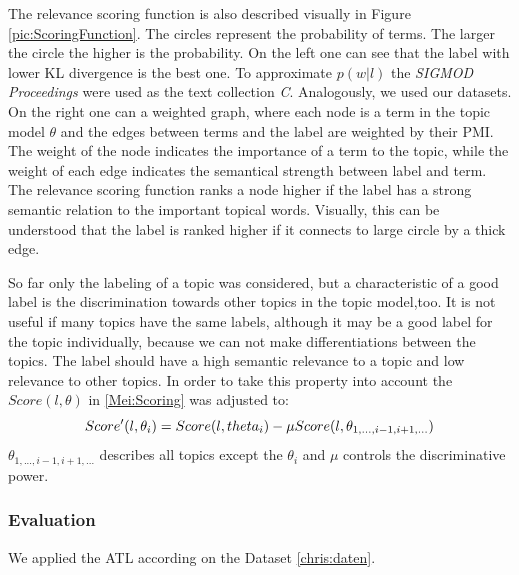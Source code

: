 The relevance scoring function is also described visually in Figure \ref{pic:ScoringFunction}. The circles represent the probability of terms. The larger the circle the higher is the probability. On the left one can see that the label with lower \ac{KL} divergence is the best one. To approximate $p(w|l)$ the \textit{SIGMOD Proceedings} were used as the text collection \textit{C}. Analogously, we used our datasets. On the right one can a weighted graph, where each node is a term in the topic model $\theta$ and the edges between terms and the label are weighted by their \ac{PMI}. The weight of the node indicates the importance of a term to the topic, while the weight of each edge indicates the semantical strength between label and term. The relevance scoring function ranks a node higher if the label has a strong semantic relation to the important topical words. Visually, this can be understood that the label is ranked higher if it connects to large circle by a thick edge.

So far only the labeling of a topic was considered, but a characteristic of a good label is the discrimination towards other topics in the topic model,too. It is not useful if many topics have the same labels, although it may be a good label for the topic individually, because we can not make differentiations between the topics. The label should have a high semantic relevance to a topic and low relevance to other topics. In order to take this property into account the $Score(l,\theta)$ in \ref{Mei:Scoring} was adjusted to: 
\begin{equation}
Score'(l,\theta_{i}) = Score(l,\\theta_{i}) - \mu Score(l,\theta_{1,...,i-1,i+1,...})
\end{equation}
$\theta_{1,...,i-1,i+1,...}$ describes all topics except the $\theta_{i}$ and $\mu$ controls the discriminative power.

\subsubsection{Evaluation}
We applied the \ac{ATL} according \cite{Mei2007} on the Dataset \ref{chris:daten}. 


